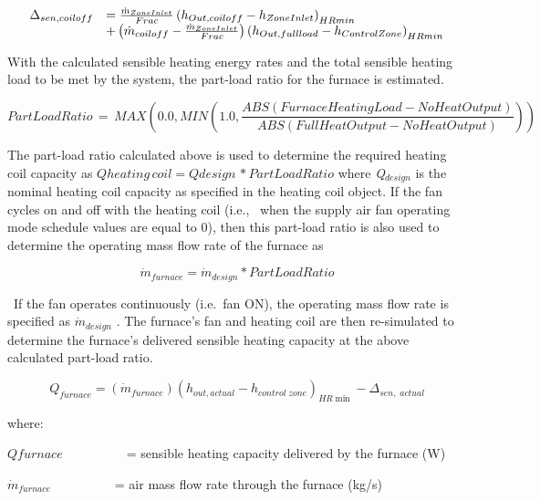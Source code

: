 \begin{equation}
  \begin{array}{rl}
    \Delta_{sen,coil off} &= \frac{\dot{m}_{ZoneInlet}}{Frac} \left(h_{Out,coil off} - h_{ZoneInlet}\right)_{HRmin} \\
                           &+ \left(\dot{m}_{coil off} - \frac{\dot{m}_{ZoneInlet}}{Frac}\right) \left(h_{Out,full load} - h_{ControlZone}\right)_{HRmin}
  \end{array}
\end{equation}

With the calculated sensible heating energy rates and the total sensible heating load to be met by the system, the part-load ratio for the furnace is estimated.

\begin{equation}
PartLoadRatio\, = \,MAX\left( {0.0,MIN\left( {1.0,\frac{{ABS\left( {FurnaceHeatingLoad - NoHeatOutput} \right)}}{{ABS(FullHeatOutput - NoHeatOutput)}}} \right)} \right)
\end{equation}

The part-load ratio calculated above is used to determine the required heating coil capacity as \(Qheating\,coil = Qdesign\,*PartLoadRatio\) where \emph{Q\(_{design}\)} is the nominal heating coil capacity as specified in the heating coil object. If the fan cycles on and off with the heating coil (i.e.,~ when the supply air fan operating mode schedule values are equal to 0), then this part-load ratio is also used to determine the operating mass flow rate of the furnace as

\begin{equation}
{\dot m_{furnace}} = {\dot m_{design}}*PartLoadRatio
\end{equation}

~If the fan operates continuously (i.e.~fan ON), the operating mass flow rate is specified as \({\dot m_{design}}\) . The furnace's fan and heating coil are then re-simulated to determine the furnace's delivered sensible heating capacity at the above calculated part-load ratio.

\begin{equation}
{Q_{furnace}} = \left( {{{\dot m}_{furnace}}} \right){\left( {{h_{out,actual}} - {h_{control\;zone}}} \right)_{HR\min }} - {\Delta_{sen,\;actual}}
\end{equation}

where:

\(Qfurnace\) ~~~~~~ ~~ = sensible heating capacity delivered by the furnace (W)

\({\dot m_{furnace}}\) ~~~~~ ~~~ = air mass flow rate through the furnace (kg/s)

